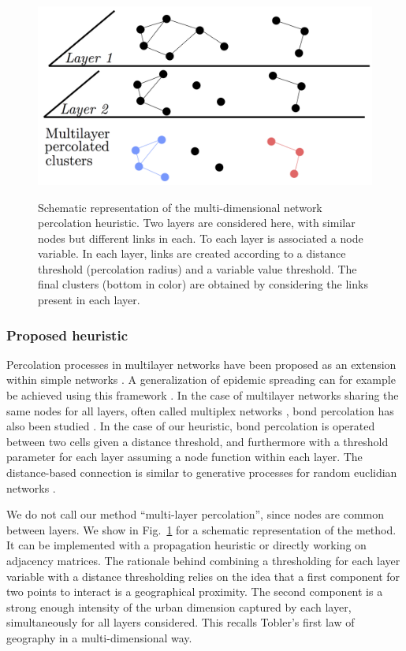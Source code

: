 \documentclass{jimis-en}
\begin{document}
\begin{figure}[ht] 
  {\includegraphics[width=\linewidth]{Fig1.png}}
  \centering
  \caption{Schematic representation of the multi-dimensional network percolation heuristic. Two layers are considered here, with similar nodes but different links in each. To each layer is associated a node variable. In each layer, links are created according to a distance threshold (percolation radius) and a variable value threshold. The final clusters (bottom in color) are obtained by considering the links present in each layer.\label{fig:method}}
\end{figure}


\subsubsection{Proposed heuristic}

Percolation processes in multilayer networks have been proposed as an extension within simple networks \citep{boccaletti2014structure}. A generalization of epidemic spreading can for example be achieved using this framework \citep{son2012percolation}. In the case of multilayer networks sharing the same nodes for all layers, often called multiplex networks \citep{aleta2018multilayer}, bond percolation has also been studied \citep{hackett2016bond}. In the case of our heuristic, bond percolation is operated between two cells given a distance threshold, and furthermore with a threshold parameter for each layer assuming a node function within each layer. The distance-based connection is similar to generative processes for random euclidian networks \citep{penrose1999k}.

We do not call our method ``multi-layer percolation'', since nodes are common between layers. We show in Fig.~\ref{fig:method} for a schematic representation of the method. It can be implemented with a propagation heuristic or directly working on adjacency matrices. The rationale behind combining a thresholding for each layer variable with a distance thresholding relies on the idea that a first component for two points to interact is a geographical proximity. The second component is a strong enough intensity of the urban dimension captured by each layer, simultaneously for all layers considered. This recalls Tobler's first law of geography \citep{tobler2004first} in a multi-dimensional way.
\end{document}
